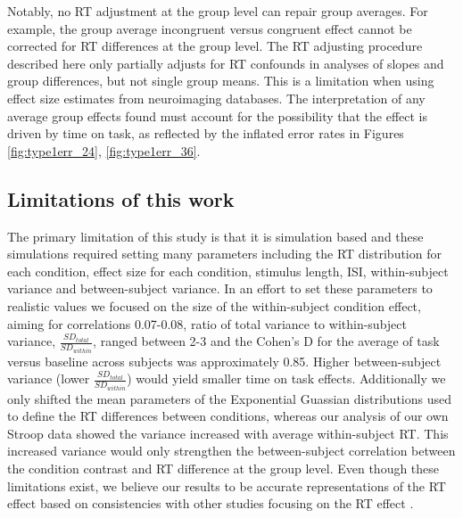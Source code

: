 \documentclass[titlepage,12pt] {article}
\begin{document}
Notably, no RT adjustment at the group level can repair group averages. For example, the group average incongruent versus congruent effect cannot be corrected for RT differences at the group level. The RT adjusting procedure described here only partially adjusts for RT confounds in analyses of slopes and group differences, but not single group means. This is a limitation when using effect size estimates from neuroimaging databases. The interpretation of any average group effects found must account for the possibility that the effect is driven by time on task, as reflected by the inflated error rates in Figures \ref{fig:type1err_24}, \ref{fig:type1err_36}.

 


\subsection*{Limitations of this work}
The primary limitation of this study is that it is simulation based and these simulations required setting many parameters including the RT distribution for each condition, effect size for each condition, stimulus length, ISI,  within-subject variance and between-subject variance.  In an effort to set these parameters to realistic values we focused on the size of the within-subject condition effect, aiming for correlations 0.07-0.08, ratio of total variance to within-subject variance, $\frac{SD_{total}}{SD_{within}}$,  ranged between 2-3 and the Cohen's D for the average of task versus baseline across subjects was approximately 0.85.  Higher between-subject variance (lower $\frac{SD_{total}}{SD_{within}}$) would yield smaller time on task effects.  Additionally we only shifted the mean parameters of the Exponential Guassian distributions used to define the RT differences between conditions, whereas our analysis of our own Stroop data showed the variance increased with average within-subject RT.  This increased variance would only strengthen the between-subject correlation between the condition contrast and RT difference at the group level.   Even though these limitations exist, we believe our results to be accurate representations of the RT effect based on consistencies with other studies focusing on the RT effect \citep{yarkoni_bold_2009, brown_medial_2011, grinband_dorsal_2011}.  %
\end{document}
